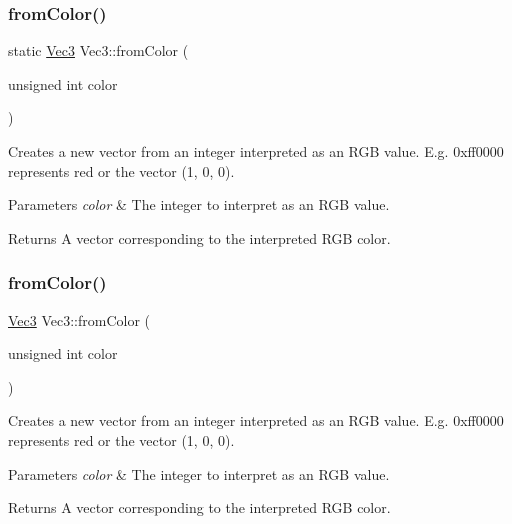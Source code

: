 \subsubsection{\texorpdfstring{from\+Color()}{fromColor()}\hspace{0.1cm}{\footnotesize\ttfamily [1/2]}}
{\footnotesize\ttfamily static \hyperlink{classVec3}{Vec3} Vec3\+::from\+Color (\begin{DoxyParamCaption}\item[{unsigned int}]{color }\end{DoxyParamCaption})\hspace{0.3cm}{\ttfamily [static]}}

Creates a new vector from an integer interpreted as an R\+GB value. E.\+g. 0xff0000 represents red or the vector (1, 0, 0).


\begin{DoxyParams}{Parameters}
{\em color} & The integer to interpret as an R\+GB value.\\
\hline
\end{DoxyParams}
\begin{DoxyReturn}{Returns}
A vector corresponding to the interpreted R\+GB color. 
\end{DoxyReturn}
\mbox{\label{classVec3_a043654e34120901b9055887ceee8e71e}} 
\subsubsection{\texorpdfstring{from\+Color()}{fromColor()}\hspace{0.1cm}{\footnotesize\ttfamily [2/2]}}
{\footnotesize\ttfamily \hyperlink{classVec3}{Vec3} Vec3\+::from\+Color (\begin{DoxyParamCaption}\item[{unsigned int}]{color }\end{DoxyParamCaption})\hspace{0.3cm}{\ttfamily [static]}}

Creates a new vector from an integer interpreted as an R\+GB value. E.\+g. 0xff0000 represents red or the vector (1, 0, 0).


\begin{DoxyParams}{Parameters}
{\em color} & The integer to interpret as an R\+GB value.\\
\hline
\end{DoxyParams}
\begin{DoxyReturn}{Returns}
A vector corresponding to the interpreted R\+GB color. 
\end{DoxyReturn}
\mbox{\label{classVec3_aed345a2ae8ac7a2a76aecf07cec2e0af}} 
